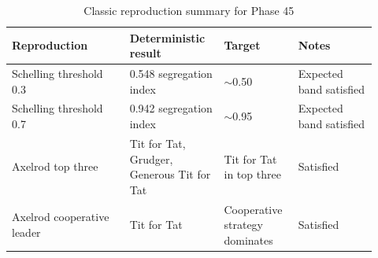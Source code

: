 \begin{table}[h]
\centering
\caption{Classic reproduction summary for Phase 45}
\begin{tabular}{p{0.30\linewidth}p{0.24\linewidth}p{0.18\linewidth}p{0.20\linewidth}}
\toprule
Reproduction & Deterministic result & Target & Notes \\
\midrule
Schelling threshold 0.3 & 0.548 segregation index & $\sim$0.50 & Expected band satisfied \\
Schelling threshold 0.7 & 0.942 segregation index & $\sim$0.95 & Expected band satisfied \\
Axelrod top three & Tit for Tat, Grudger, Generous Tit for Tat & Tit for Tat in top three & Satisfied \\
Axelrod cooperative leader & Tit for Tat & Cooperative strategy dominates & Satisfied \\
\bottomrule
\end{tabular}
\end{table}
